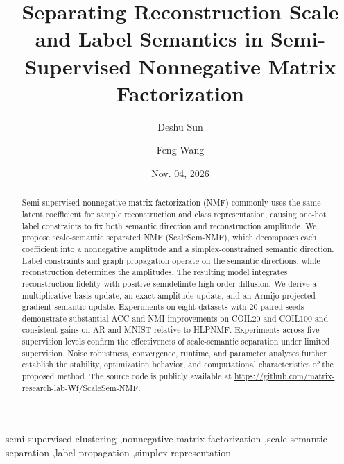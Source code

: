 \documentclass[a4paper,preprint,12pt]{elsarticle}
\date{Nov. 04, 2026}
\theoremstyle{remark}
\begin{document}
\raggedbottom%
\begin{frontmatter}
\title{Separating Reconstruction Scale and Label Semantics in Semi-Supervised Nonnegative Matrix Factorization}

\author{Deshu Sun}
\author{Feng Wang }
\address{College of Data Science and Information Engineering, Guizhou Minzu University, Guiyang, Guizhou 550025, P.R. China}
\begin{abstract}
Semi-supervised nonnegative matrix factorization (NMF) commonly uses the same latent coefficient for sample reconstruction and class representation, causing one-hot label constraints to fix both semantic direction and reconstruction amplitude. We propose scale-semantic separated NMF (ScaleSem-NMF), which decomposes each coefficient into a nonnegative amplitude and a simplex-constrained semantic direction. Label constraints and graph propagation operate on the semantic directions, while reconstruction determines the amplitudes. The resulting model integrates reconstruction fidelity with positive-semidefinite high-order diffusion. We derive a multiplicative basis update, an exact amplitude update, and an Armijo projected-gradient semantic update. Experiments on eight datasets with 20 paired seeds demonstrate substantial ACC and NMI improvements on COIL20 and COIL100 and consistent gains on AR and MNIST relative to HLPNMF. Experiments across five supervision levels confirm the effectiveness of scale-semantic separation under limited supervision. Noise robustness, convergence, runtime, and parameter analyses further establish the stability, optimization behavior, and computational characteristics of the proposed method. The source code is publicly available at \url{https://github.com/matrix-research-lab-Wf/ScaleSem-NMF}.
\end{abstract}
\begin{keyword}
semi-supervised clustering \sep nonnegative matrix factorization \sep scale-semantic separation \sep label propagation \sep simplex representation
\end{keyword}
\end{frontmatter}

\doublespacing
\setlength{\parskip}{0pt}
\setlength{\abovedisplayskip}{3pt plus 1pt minus 1pt}
\setlength{\belowdisplayskip}{3pt plus 1pt minus 1pt}
\setlength{\abovedisplayshortskip}{1pt plus 1pt minus 1pt}
\setlength{\belowdisplayshortskip}{2pt plus 1pt minus 1pt}
\setlength{\jot}{2pt}
\end{document}
